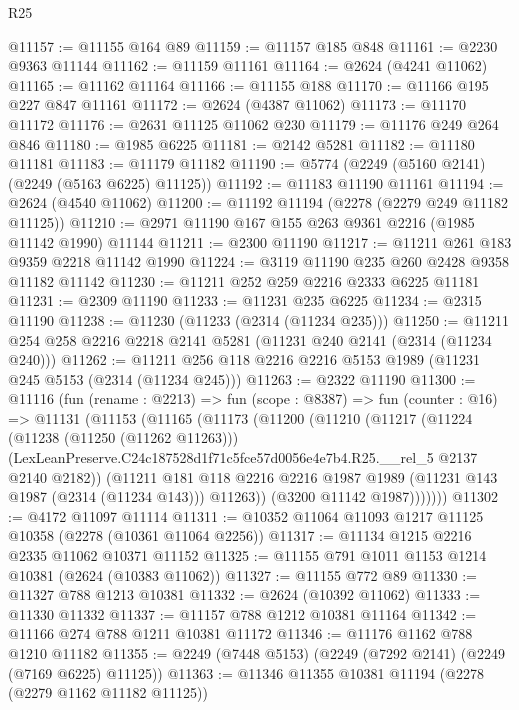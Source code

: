 \begin{lexlean}{R25}
\begin{coremodule}
@11157 := @11155 @164 @89
@11159 := @11157 @185 @848
@11161 := @2230 @9363 @11144
@11162 := @11159 @11161
@11164 := @2624 (@4241 @11062)
@11165 := @11162 @11164
@11166 := @11155 @188
@11170 := @11166 @195 @227 @847 @11161
@11172 := @2624 (@4387 @11062)
@11173 := @11170 @11172
@11176 := @2631 @11125 @11062 @230
@11179 := @11176 @249 @264 @846
@11180 := @1985 @6225
@11181 := @2142 @5281
@11182 := @11180 @11181
@11183 := @11179 @11182
@11190 := @5774 (@2249 (@5160 @2141) (@2249 (@5163 @6225) @11125))
@11192 := @11183 @11190 @11161
@11194 := @2624 (@4540 @11062)
@11200 := @11192 @11194 (@2278 (@2279 @249 @11182 @11125))
@11210 := @2971 @11190 @167 @155 @263 @9361 @2216 (@1985 @11142 @1990) @11144
@11211 := @2300 @11190
@11217 := @11211 @261 @183 @9359 @2218 @11142 @1990
@11224 := @3119 @11190 @235 @260 @2428 @9358 @11182 @11142
@11230 := @11211 @252 @259 @2216 @2333 @6225 @11181
@11231 := @2309 @11190
@11233 := @11231 @235 @6225
@11234 := @2315 @11190
@11238 := @11230 (@11233 (@2314 (@11234 @235)))
@11250 := @11211 @254 @258 @2216 @2218 @2141 @5281 (@11231 @240 @2141 (@2314 (@11234 @240)))
@11262 := @11211 @256 @118 @2216 @2216 @5153 @1989 (@11231 @245 @5153 (@2314 (@11234 @245)))
@11263 := @2322 @11190
@11300 := @11116
    (fun (rename : @2213) =>
    fun (scope : @8387) =>
    fun (counter : @16) =>
    @11131
      (@11153
        (@11165
          (@11173
            (@11200
              (@11210
                (@11217
                  (@11224
                    (@11238 (@11250 (@11262 @11263)))
                    (LexLeanPreserve.C24c187528d1f71c5fce57d0056e4e7b4.R25.__rel_5
                      @2137
                      @2140
                      @2182))
                  (@11211
                    @181
                    @118
                    @2216
                    @2216
                    @1987
                    @1989
                    (@11231 @143 @1987 (@2314 (@11234 @143)))
                    @11263))
                (@3200 @11142 @1987)))))))
@11302 := @4172 @11097 @11114
@11311 := @10352 @11064 @11093 @1217 @11125 @10358 (@2278 (@10361 @11064 @2256))
@11317 := @11134 @1215 @2216 @2335 @11062 @10371 @11152
@11325 := @11155 @791 @1011 @1153 @1214 @10381 (@2624 (@10383 @11062))
@11327 := @11155 @772 @89
@11330 := @11327 @788 @1213 @10381
@11332 := @2624 (@10392 @11062)
@11333 := @11330 @11332
@11337 := @11157 @788 @1212 @10381 @11164
@11342 := @11166 @274 @788 @1211 @10381 @11172
@11346 := @11176 @1162 @788 @1210 @11182
@11355 := @2249 (@7448 @5153) (@2249 (@7292 @2141) (@2249 (@7169 @6225) @11125))
@11363 := @11346 @11355 @10381 @11194 (@2278 (@2279 @1162 @11182 @11125))

\end{coremodule}
\end{lexlean}
